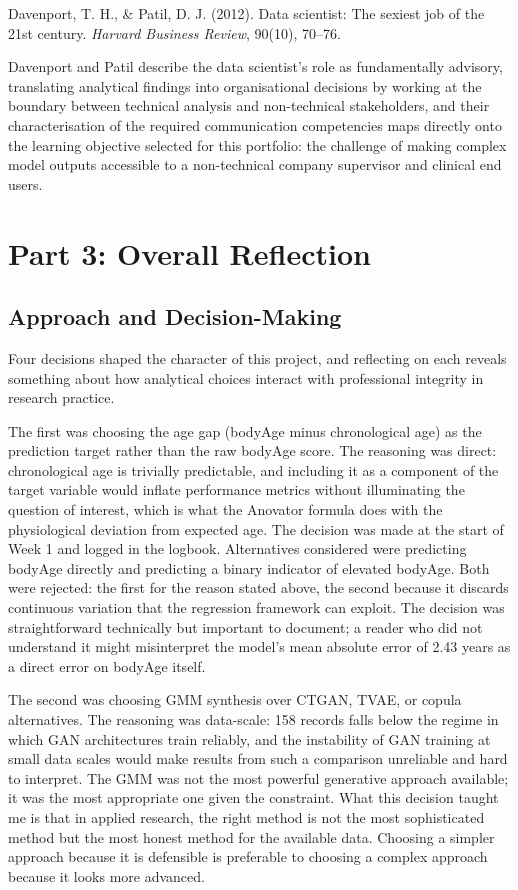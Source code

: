 \documentclass[11pt,a4paper]{report}
\begin{document}
Davenport, T. H., \& Patil, D. J. (2012). Data scientist: The sexiest job of the 21st century.
\textit{Harvard Business Review}, 90(10), 70--76.

Davenport and Patil describe the data scientist's role as fundamentally advisory, translating
analytical findings into organisational decisions by working at the boundary between technical
analysis and non-technical stakeholders, and their characterisation of the required communication
competencies maps directly onto the learning objective selected for this portfolio: the challenge of
making complex model outputs accessible to a non-technical company supervisor and clinical end
users.

\chapter{Part 3: Overall Reflection}

\section{Approach and Decision-Making}

Four decisions shaped the character of this project, and reflecting on each reveals something about
how analytical choices interact with professional integrity in research practice.

The first was choosing the age gap (bodyAge minus chronological age) as the prediction target
rather than the raw bodyAge score. The reasoning was direct: chronological age is trivially
predictable, and including it as a component of the target variable would inflate performance
metrics without illuminating the question of interest, which is what the Anovator formula does with
the physiological deviation from expected age. The decision was made at the start of Week 1 and
logged in the logbook. Alternatives considered were predicting bodyAge directly and predicting a
binary indicator of elevated bodyAge. Both were rejected: the first for the reason stated above,
the second because it discards continuous variation that the regression framework can exploit. The
decision was straightforward technically but important to document; a reader who did not understand
it might misinterpret the model's mean absolute error of 2.43 years as a direct error on bodyAge
itself.

The second was choosing GMM synthesis over CTGAN, TVAE, or copula alternatives. The reasoning was
data-scale: 158 records falls below the regime in which GAN architectures train reliably, and the
instability of GAN training at small data scales would make results from such a comparison
unreliable and hard to interpret. The GMM was not the most powerful generative approach available;
it was the most appropriate one given the constraint. What this decision taught me is that in
applied research, the right method is not the most sophisticated method but the most honest method
for the available data. Choosing a simpler approach because it is defensible is preferable to
choosing a complex approach because it looks more advanced.
\end{document}
